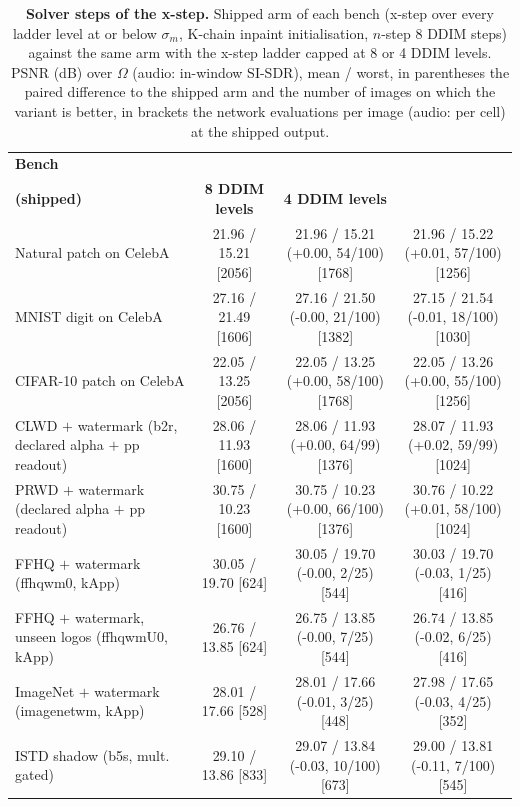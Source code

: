 \begin{table}[t]
    \centering
    \caption{\textbf{Solver steps of the x-step.} Shipped \methodmin{} arm of each bench (x-step over every ladder level at or below $\sigma_m$, K-chain inpaint initialisation, $n$-step 8 DDIM steps) against the same arm with the x-step ladder capped at 8 or 4 DDIM levels. PSNR (dB) over $\Omega$ (audio: in-window SI-SDR), mean / worst, in parentheses the paired difference to the shipped arm and the number of images on which the variant is better, in brackets the network evaluations per image (audio: per cell) at the shipped output.}
    \label{tab:xs_levels}
    \small
    \setlength{\tabcolsep}{3pt}
    \begin{tabular}{@{}lccc@{}}
        \toprule
        \textbf{Bench} & \shortstack{\textbf{all levels}\\\textbf{(shipped)}} & \textbf{8 DDIM levels} & \textbf{4 DDIM levels} \\
        \midrule
        Natural patch on CelebA & 21.96 / 15.21 [2056] & 21.96 / 15.21 (+0.00, 54/100) [1768] & 21.96 / 15.22 (+0.01, 57/100) [1256] \\
        MNIST digit on CelebA & 27.16 / 21.49 [1606] & 27.16 / 21.50 (-0.00, 21/100) [1382] & 27.15 / 21.54 (-0.01, 18/100) [1030] \\
        CIFAR-10 patch on CelebA & 22.05 / 13.25 [2056] & 22.05 / 13.25 (+0.00, 58/100) [1768] & 22.05 / 13.26 (+0.00, 55/100) [1256] \\
        CLWD $+$ watermark (b2r, declared alpha $+$ pp readout) & 28.06 / 11.93 [1600] & 28.06 / 11.93 (+0.00, 64/99) [1376] & 28.07 / 11.93 (+0.02, 59/99) [1024] \\
        PRWD $+$ watermark (declared alpha $+$ pp readout) & 30.75 / 10.23 [1600] & 30.75 / 10.23 (+0.00, 66/100) [1376] & 30.76 / 10.22 (+0.01, 58/100) [1024] \\
        FFHQ $+$ watermark (ffhqwm0, kApp) & 30.05 / 19.70 [624] & 30.05 / 19.70 (-0.00, 2/25) [544] & 30.03 / 19.70 (-0.03, 1/25) [416] \\
        FFHQ $+$ watermark, unseen logos (ffhqwmU0, kApp) & 26.76 / 13.85 [624] & 26.75 / 13.85 (-0.00, 7/25) [544] & 26.74 / 13.85 (-0.02, 6/25) [416] \\
        ImageNet $+$ watermark (imagenetwm, kApp) & 28.01 / 17.66 [528] & 28.01 / 17.66 (-0.01, 3/25) [448] & 27.98 / 17.65 (-0.03, 4/25) [352] \\
        ISTD shadow (b5s, mult. gated) & 29.10 / 13.86 [833] & 29.07 / 13.84 (-0.03, 10/100) [673] & 29.00 / 13.81 (-0.11, 7/100) [545] \\

\end{tabular}
\end{table}

